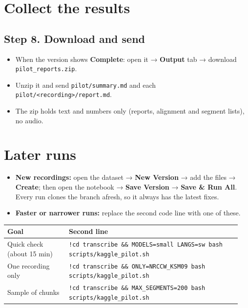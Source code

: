 \documentclass[11pt]{article}
\begin{document}
\section{Collect the results}\label{results}

\subsection*{Step 8. Download and send}
\begin{itemize}
\item When the version shows \textbf{Complete}: open it → \textbf{Output} tab → download \texttt{pilot\_reports.zip}.
\item Unzip it and send \texttt{pilot/summary.md} and each \texttt{pilot/<recording>/report.md}.
\item The zip holds text and numbers only (reports, alignment and segment lists), no audio.
\end{itemize}

\section{Later runs}\label{later-runs}

\begin{itemize}
\item \textbf{New recordings:} open the dataset → \textbf{New Version} → add the files → \textbf{Create}; then open the notebook → \textbf{Save Version} → \textbf{Save \& Run All}. Every run clones the branch afresh, so it always has the latest fixes.
\item \textbf{Faster or narrower runs:} replace the second code line with one of these.
\end{itemize}

\begin{longtable}[]{@{}>{\raggedright\arraybackslash}p{0.25\linewidth}>{\raggedright\arraybackslash}p{0.7\linewidth}@{}}
\toprule\noalign{}
Goal & Second line \\
\midrule\noalign{}
\endhead
\bottomrule\noalign{}
\endlastfoot
Quick check (about 15 min) & \texttt{!cd transcribe \&\& MODELS=small LANGS=sw bash scripts/\allowbreak{}kaggle\_pilot.sh} \\
One recording only & \texttt{!cd transcribe \&\& ONLY=NRCCW\_KSM09 bash scripts/\allowbreak{}kaggle\_pilot.sh} \\
Sample of chunks & \texttt{!cd transcribe \&\& MAX\_SEGMENTS=200 bash scripts/\allowbreak{}kaggle\_pilot.sh} \\
\end{longtable}
\end{document}
